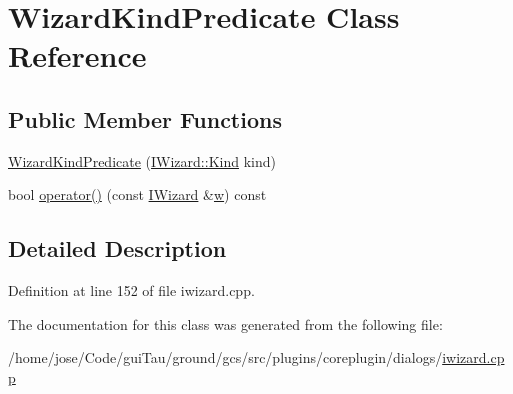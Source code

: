 \hypertarget{class_wizard_kind_predicate}{\section{Wizard\-Kind\-Predicate Class Reference}
\label{class_wizard_kind_predicate}
}
\subsection*{Public Member Functions}
\begin{DoxyCompactItemize}
\item 
\hyperlink{group___core_plugin_ga7ad7e94acedad1cb0bddb6f54079afb7}{Wizard\-Kind\-Predicate} (\hyperlink{group___core_plugin_ga90d21d8ad72cb14ddb8486fdff7b51f4}{I\-Wizard\-::\-Kind} kind)
\item 
bool \hyperlink{group___core_plugin_ga2116c3cbb7f3bfd113f1ff84d4394a4c}{operator()} (const \hyperlink{class_core_1_1_i_wizard}{I\-Wizard} \&\hyperlink{glext_8h_ac1795f3b2fee217274b85c2750e1a889}{w}) const 
\end{DoxyCompactItemize}


\subsection{Detailed Description}


Definition at line 152 of file iwizard.\-cpp.



The documentation for this class was generated from the following file\-:\begin{DoxyCompactItemize}
\item 
/home/jose/\-Code/gui\-Tau/ground/gcs/src/plugins/coreplugin/dialogs/\hyperlink{iwizard_8cpp}{iwizard.\-cpp}\end{DoxyCompactItemize}
